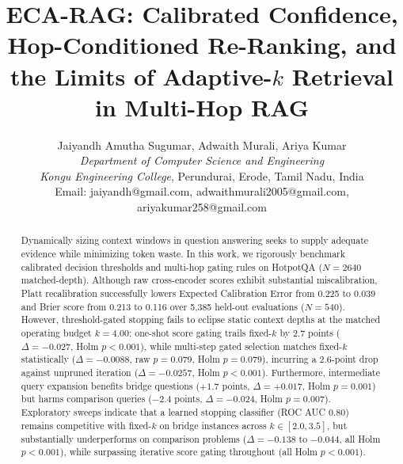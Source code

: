 \documentclass{article}
\begin{document}

\title{ECA-RAG: Calibrated Confidence, Hop-Conditioned Re-Ranking, and the Limits of Adaptive-$k$ Retrieval in Multi-Hop RAG}

\author{Jaiyandh Amutha Sugumar, Adwaith Murali, Ariya Kumar\\
\textit{Department of Computer Science and Engineering}\\
\textit{Kongu Engineering College}, Perundurai, Erode, Tamil Nadu, India\\
Email: jaiyandh@gmail.com, adwaithmurali2005@gmail.com, ariyakumar258@gmail.com}

\maketitle

\begin{abstract}
Dynamically sizing context windows in question answering seeks to supply adequate evidence while minimizing token waste. In this work, we rigorously benchmark calibrated decision thresholds and multi-hop gating rules on HotpotQA ($N=2640$ matched-depth). Although raw cross-encoder scores exhibit substantial miscalibration, Platt recalibration successfully lowers Expected Calibration Error from 0.225 to 0.039 and Brier score from 0.213 to 0.116 over 5,385 held-out evaluations ($N=540$). However, threshold-gated stopping fails to eclipse static context depths at the matched operating budget $k=4.00$: one-shot score gating trails fixed-$k$ by 2.7 points ($\Delta = -0.027$, Holm $p < 0.001$), while multi-step gated selection matches fixed-$k$ statistically ($\Delta = -0.0088$, raw $p=0.079$, Holm $p=0.079$), incurring a 2.6-point drop against unpruned iteration ($\Delta = -0.0257$, Holm $p < 0.001$). Furthermore, intermediate query expansion benefits bridge questions ($+1.7$ points, $\Delta = +0.017$, Holm $p=0.001$) but harms comparison queries ($-2.4$ points, $\Delta = -0.024$, Holm $p=0.007$). Exploratory sweeps indicate that a learned stopping classifier (ROC AUC 0.80) remains competitive with fixed-$k$ on bridge instances across $k \in [2.0, 3.5]$, but substantially underperforms on comparison problems ($\Delta = -0.138$ to $-0.044$, all Holm $p < 0.001$), while surpassing iterative score gating throughout (all Holm $p < 0.001$).
\end{abstract}
\end{document}
